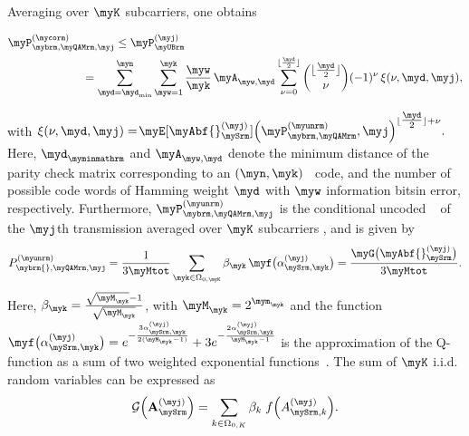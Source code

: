 Averaging over $\myK$ subcarriers, one obtains

\begin{align}
\myP^{(\mycorm)}_{\mybrm,\myQAMrm,\myj}
&\le \myP^{(\myj)}_{\myUBrm} \notag \\
&\hspace{-1cm}= \sum_{\myd = \myd_{\min}}^{\myn}
   \sum_{\myw = 1}^{\myk}
   \frac{\myw}{\myk}\, \myA_{\myw,\myd}
   \sum_{\nu = 0}^{\lfloor\frac{\myd}{2}\rfloor}
   \binom{\lfloor\frac{\myd}{2}\rfloor}{\nu}
   (-1)^{\nu}\,
   \xi(\nu,\myd,\myj),
\label{eq:4}
\end{align}

with \!$\xi(\nu,\myd,\myj)
=\!\myE[\myAbf{}^{(\myj)}_{\mySrm}]
{
\Bigl(\myP^{(\myunrm)}_{\mybrm,\myQAMrm},\myj\Bigr)^{\lfloor \tfrac{\myd}{2} \rfloor + \nu}
}.$ Here, $\myd_{\myminmathrm}$ and $\myA_{\myw,\myd}$ denote the minimum distance of the parity check matrix corresponding to an $(\myn,\myk)$ \myLDPC\ code, and the number of possible code words of Hamming weight $\myd$ with $\myw$ information bits\linebreak in error, respectively. Furthermore, $\myP^{(\myunrm)}_{\mybrm,\myQAMrm,\myj}$ is the conditional uncoded \mySU\ \myBEP{} of the $\myj$th transmission averaged over $\myK$ subcarriers \cite{Mutti2003_alt}, and is given by
\begin{equation*}
P^{(\myunrm)}_{\mybrm{},\myQAMrm,\myj}
= \frac{1}{3\myMtot}
  \sum_{\myk \in \Omega_{0,\myK}} \beta_{\myk}\,
  \myf\bigl(\alpha^{(\myj)}_{\mySrm,\myk}\bigr)
= \frac{\myG\bigl(\myAbf{}^{(\myj)}_{\mySrm}\bigr)}{3\myMtot}.
\end{equation*}
Here, $\beta_{\myk}= \frac{\sqrt{\myM_{\myk}} - 1}{\sqrt{\myM_{\myk}}}$, with
$\myM_{\myk} = 2^{\mym_{\myk}}$ and the function $
\myf\bigl(\alpha^{(\myj)}_{\mySrm,\myk}\bigr)
=
e^{-\frac{3\alpha^{(\myj)}_{\mySrm,\myk}}{2(\myM_{\myk}-1)}}
+ 3 e^{-\frac{2\alpha^{(\myj)}_{\mySrm,\myk}}{\myM_{\myk}-1}}
$ is the approximation of the Q-function as a sum of two weighted exponential functions~\cite{Mutti2003_alt,Karagiannidis2007_alt}.
The sum of $\myK$ i.i.d. random variables can be expressed as
\[
\mathcal{G}\Bigl(\mathbf{A}^{(\myj)}_{\mySrm}\Bigr) 
= \sum_{k \in \Omega_{0,K}} \beta_k \; 
  f\Bigl(A^{(\myj)}_{\mySrm,k}\Bigr).
\]
\newpage

